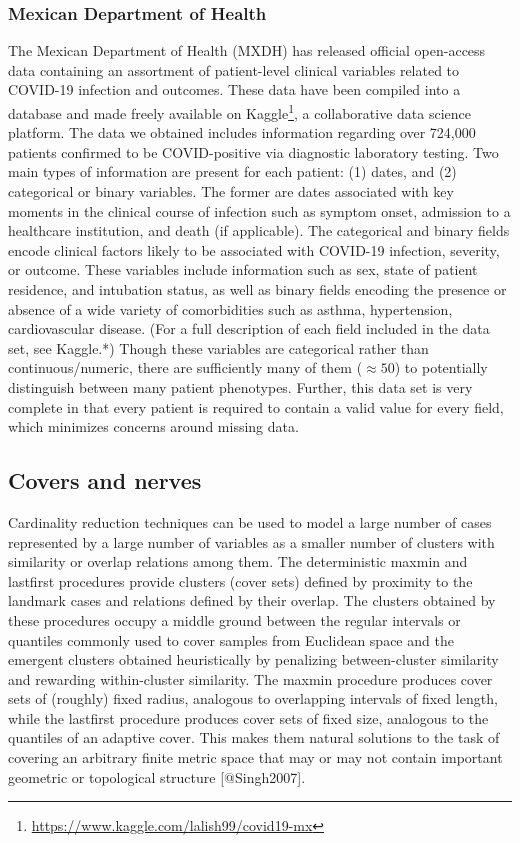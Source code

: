 \documentclass[
]{article}
\begin{document}
\hypertarget{mexican-department-of-health}{%
\subsubsection{Mexican Department of
Health}\label{mexican-department-of-health}}

The Mexican Department of Health (MXDH) has released official
open-access data containing an assortment of patient-level clinical
variables related to COVID-19 infection and outcomes. These data have
been compiled into a database and made freely available on
Kaggle\footnote{\url{https://www.kaggle.com/lalish99/covid19-mx}}, a
collaborative data science platform. The data we obtained includes
information regarding over 724,000 patients confirmed to be
COVID-positive via diagnostic laboratory testing. Two main types of
information are present for each patient: (1) dates, and (2) categorical
or binary variables. The former are dates associated with key moments in
the clinical course of infection such as symptom onset, admission to a
healthcare institution, and death (if applicable). The categorical and
binary fields encode clinical factors likely to be associated with
COVID-19 infection, severity, or outcome. These variables include
information such as sex, state of patient residence, and intubation
status, as well as binary fields encoding the presence or absence of a
wide variety of comorbidities such as asthma, hypertension,
cardiovascular disease. (For a full description of each field included
in the data set, see Kaggle.*) Though these variables are categorical
rather than continuous/numeric, there are sufficiently many of them
(\(\approx 50\)) to potentially distinguish between many patient
phenotypes. Further, this data set is very complete in that every
patient is required to contain a valid value for every field, which
minimizes concerns around missing data.

\hypertarget{covers-and-nerves}{%
\subsection{Covers and nerves}\label{covers-and-nerves}}

Cardinality reduction techniques can be used to model a large number of
cases represented by a large number of variables as a smaller number of
clusters with similarity or overlap relations among them. The
deterministic maxmin and lastfirst procedures provide clusters (cover
sets) defined by proximity to the landmark cases and relations defined
by their overlap. The clusters obtained by these procedures occupy a
middle ground between the regular intervals or quantiles commonly used
to cover samples from Euclidean space and the emergent clusters obtained
heuristically by penalizing between-cluster similarity and rewarding
within-cluster similarity. The maxmin procedure produces cover sets of
(roughly) fixed radius, analogous to overlapping intervals of fixed
length, while the lastfirst procedure produces cover sets of fixed size,
analogous to the quantiles of an adaptive cover. This makes them natural
solutions to the task of covering an arbitrary finite metric space that
may or may not contain important geometric or topological structure
{[}@Singh2007{]}.
\end{document}
